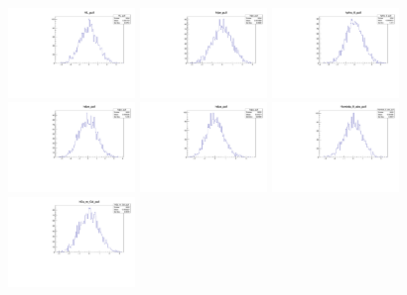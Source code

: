 \begin{figure}[tb]
   \begin{center}
	\includegraphics[width=0.3\textwidth]{figs/MCwBkgPulls/fL_pull.pdf}
	\includegraphics[width=0.3\textwidth]{figs/MCwBkgPulls/fpe_pull.pdf}
	\includegraphics[width=0.3\textwidth]{figs/MCwBkgPulls/phis_0_pull.pdf}
	\includegraphics[width=0.3\textwidth]{figs/MCwBkgPulls/dpe_pull.pdf}
	\includegraphics[width=0.3\textwidth]{figs/MCwBkgPulls/dpa_pull.pdf}
	\includegraphics[width=0.3\textwidth]{figs/MCwBkgPulls/lambda_0_abs_pull.pdf}
	\includegraphics[width=0.3\textwidth]{figs/MCwBkgPulls/Gs_m_Gd_pull.pdf}

\end{center}
\end{figure}
